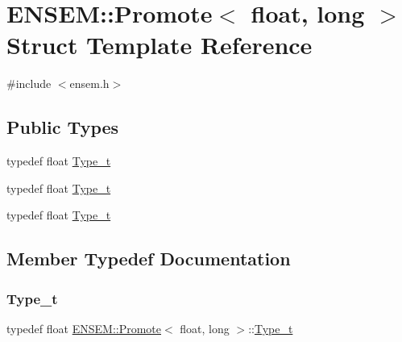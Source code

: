 \hypertarget{structENSEM_1_1Promote_3_01float_00_01long_01_4}{}\section{E\+N\+S\+EM\+:\+:Promote$<$ float, long $>$ Struct Template Reference}
\label{structENSEM_1_1Promote_3_01float_00_01long_01_4}


{\ttfamily \#include $<$ensem.\+h$>$}

\subsection*{Public Types}
\begin{DoxyCompactItemize}
\item 
typedef float \mbox{\hyperlink{structENSEM_1_1Promote_3_01float_00_01long_01_4_ab0b76c324678abb784e8e19c41e172c0}{Type\+\_\+t}}
\item 
typedef float \mbox{\hyperlink{structENSEM_1_1Promote_3_01float_00_01long_01_4_ab0b76c324678abb784e8e19c41e172c0}{Type\+\_\+t}}
\item 
typedef float \mbox{\hyperlink{structENSEM_1_1Promote_3_01float_00_01long_01_4_ab0b76c324678abb784e8e19c41e172c0}{Type\+\_\+t}}
\end{DoxyCompactItemize}


\subsection{Member Typedef Documentation}
\mbox{\label{structENSEM_1_1Promote_3_01float_00_01long_01_4_ab0b76c324678abb784e8e19c41e172c0}} 
\subsubsection{\texorpdfstring{Type\_t}{Type\_t}\hspace{0.1cm}{\footnotesize\ttfamily [1/3]}}
{\footnotesize\ttfamily typedef float \mbox{\hyperlink{structENSEM_1_1Promote}{E\+N\+S\+E\+M\+::\+Promote}}$<$ float, long $>$\+::\mbox{\hyperlink{structENSEM_1_1Promote_3_01float_00_01long_01_4_ab0b76c324678abb784e8e19c41e172c0}{Type\+\_\+t}}}

